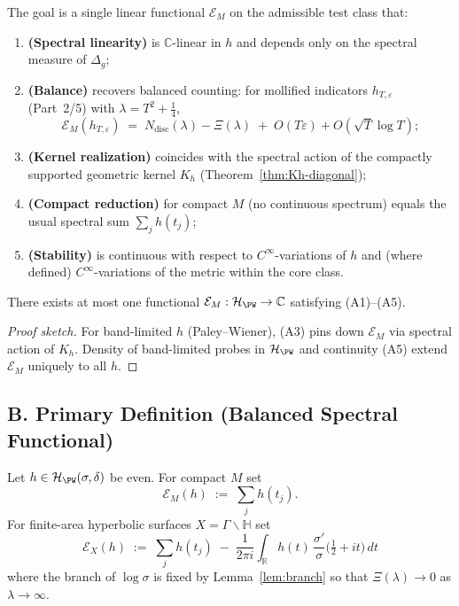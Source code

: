 The goal is a single linear functional $\mathcal E_M$ on the admissible test class that:
\begin{enumerate}[label=(A\arabic*)]
  \item \textbf{(Spectral linearity)} is $\mathbb C$-linear in $h$ and depends only on the spectral measure of $\Delta_g$;
  \item \textbf{(Balance)} recovers balanced counting: for mollified indicators $h_{T,\varepsilon}$ (Part~2/5) with $\lambda=T^2+\tfrac14$,
  \[
     \mathcal E_M(h_{T,\varepsilon}) \;=\; N_{\mathrm{disc}}(\lambda)-\Xi(\lambda) \;+\; O(T\varepsilon)+O(\sqrt{T}\log T);
  \]
  \item \textbf{(Kernel realization)} coincides with the spectral action of the compactly supported geometric kernel $K_h$ (Theorem~\ref{thm:Kh-diagonal});
  \item \textbf{(Compact reduction)} for compact $M$ (no continuous spectrum) equals the usual spectral sum $\sum_j h(t_j)$;
  \item \textbf{(Stability)} is continuous with respect to $C^\infty$-variations of $h$ and (where defined) $C^\infty$-variations of the metric within the core class.
\end{enumerate}

\begin{proposition}[Uniqueness]
\label{prop:uniqueness}
There exists at most one functional $\mathcal E_M:\mathcal H_{\PW}\to\mathbb C$ satisfying (A1)–(A5).
\end{proposition}

\begin{proof}[Proof sketch]
For band-limited $h$ (Paley–Wiener), (A3) pins down $\mathcal E_M$ via spectral action of $K_h$. Density of band-limited probes in $\mathcal H_{\PW}$ and continuity (A5) extend $\mathcal E_M$ uniquely to all $h$.
\end{proof}


\subsection*{B. Primary Definition (Balanced Spectral Functional)}
\label{subsec:primary-def}

\begin{definition}
\label{def:eono}
Let $h\in\mathcal H_{\PW}(\sigma,\delta)$ be even. For compact $M$ set
\[
  \mathcal E_M(h) \;:=\; \sum_j h(t_j).
\]
For finite-area hyperbolic surfaces $X=\Gamma\backslash\mathbb H$ set
\[
  \boxed{\quad
  \mathcal E_X(h)
  \;:=\;
  \sum_{j} h(t_j)
  \;-\;
  \frac{1}{2\pi i}\int_{\mathbb R} h(t)\,\frac{\sigma'}{\sigma}\!\Big(\tfrac12+it\Big)\,dt
  \quad}
\]
where the branch of $\log\sigma$ is fixed by Lemma~\ref{lem:branch} so that $\Xi(\lambda)\to 0$ as $\lambda\to\infty$.
\end{definition}

